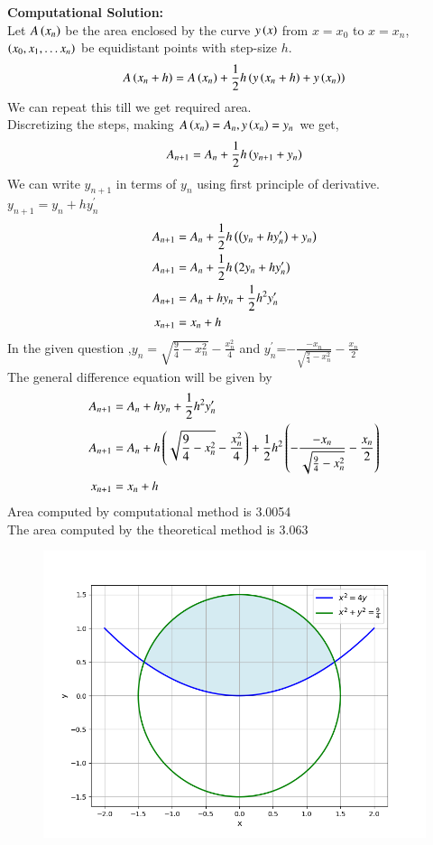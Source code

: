 \documentclass[journal]{IEEEtran}
\numberwithin{equation}{enumi}
\numberwithin{figure}{enumi}
\begin{document}
\textbf{Computational Solution:}\\
Let $A\left(x_n\right)$ be the area enclosed by the curve $y\left(x\right)$ from $x=x_0$ to $x=x_n$, $\left(x_0, x_1, \dots x_n\right)$ be equidistant points with step-size $h$.
\begin{align}
  A\left(x_n+h\right)=A\left(x_n\right)+\frac{1}{2}h\left(y\left(x_n+h\right)+y\left(x_n\right)\right)
\end{align}
We can repeat this till we get required area.\\
Discretizing the steps, making $A\left(x_n\right)=A_n, y\left(x_n\right)=y_n$ we get,
\begin{align}
 A_{n+1}=A_n+\frac{1}{2}h\left(y_{n+1}+y_n\right)
\end{align}
We can write $y_{n+1}$ in terms of $y_n$ using first principle of derivative. $y_{n+1}=y_n+hy^{\prime}_n$
\begin{align}
  A_{n+1}&=A_n+\frac{1}{2}h\left(\left(y_{n}+hy^{\prime}_n\right)+y_n\right)\\
  A_{n+1}&=A_n+\frac{1}{2}h\left(2y_n+hy^{\prime}_n\right)\\
  A_{n+1}&=A_n+hy_n+\frac{1}{2}h^2y^{\prime}_n\\
  x_{n+1}&=x_n+h
\end{align}
In the given question ,$y_n=\sqrt{\frac{9}{4}-x_n^2}-\frac{x_n^2}{4}$ and $y_n^{\prime}$=$-\frac{-x_n}{\sqrt{\frac{9}{4}-x_n^2}}-\frac{x_n}{2}$\\
The general difference equation will be given by
\begin{align}
  A_{n+1}&=A_n+hy_n+\frac{1}{2}h^2y^{\prime}_n\\
  A_{n+1}&=A_n+h\left(\sqrt{\frac{9}{4}-x_n^2}-\frac{x_n^2}{4}\right)+\frac{1}{2}h^2\left(-\frac{-x_n}{\sqrt{\frac{9}{4}-x_n^2}}-\frac{x_n}{2}\right)\\
   x_{n+1}&=x_n+h
\end{align}
Area computed by computational method is 3.0054\\
The area computed by the theoretical method is 3.063
\begin{figure}[h!]
	\centering
	\includegraphics[width=\columnwidth]{figs/Figure_1.png}
	\label{stemplot}
\end{figure}
\end{document}
